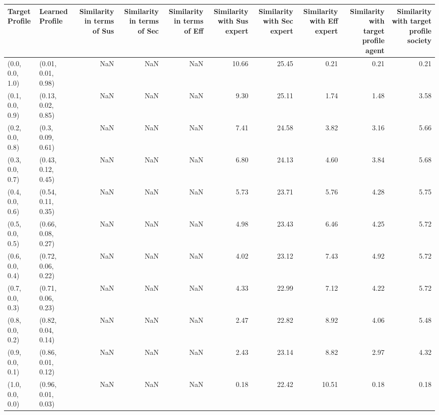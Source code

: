 \begin{tabular}{llrrrrrrrr}
\toprule
Target Profile & Learned Profile & Similarity in terms of Sus & Similarity in terms of Sec & Similarity in terms of Eff & Similarity with Sus expert & Similarity with Sec expert & Similarity with Eff expert & Similarity with target profile agent & Similarity with target profile society \\
\midrule
(0.0, 0.0, 1.0) & (0.01, 0.01, 0.98) & NaN & NaN & NaN & 10.66 & 25.45 & 0.21 & 0.21 & 0.21 \\
(0.1, 0.0, 0.9) & (0.13, 0.02, 0.85) & NaN & NaN & NaN & 9.30 & 25.11 & 1.74 & 1.48 & 3.58 \\
(0.2, 0.0, 0.8) & (0.3, 0.09, 0.61) & NaN & NaN & NaN & 7.41 & 24.58 & 3.82 & 3.16 & 5.66 \\
(0.3, 0.0, 0.7) & (0.43, 0.12, 0.45) & NaN & NaN & NaN & 6.80 & 24.13 & 4.60 & 3.84 & 5.68 \\
(0.4, 0.0, 0.6) & (0.54, 0.11, 0.35) & NaN & NaN & NaN & 5.73 & 23.71 & 5.76 & 4.28 & 5.75 \\
(0.5, 0.0, 0.5) & (0.66, 0.08, 0.27) & NaN & NaN & NaN & 4.98 & 23.43 & 6.46 & 4.25 & 5.72 \\
(0.6, 0.0, 0.4) & (0.72, 0.06, 0.22) & NaN & NaN & NaN & 4.02 & 23.12 & 7.43 & 4.92 & 5.72 \\
(0.7, 0.0, 0.3) & (0.71, 0.06, 0.23) & NaN & NaN & NaN & 4.33 & 22.99 & 7.12 & 4.22 & 5.72 \\
(0.8, 0.0, 0.2) & (0.82, 0.04, 0.14) & NaN & NaN & NaN & 2.47 & 22.82 & 8.92 & 4.06 & 5.48 \\
(0.9, 0.0, 0.1) & (0.86, 0.01, 0.12) & NaN & NaN & NaN & 2.43 & 23.14 & 8.82 & 2.97 & 4.32 \\
(1.0, 0.0, 0.0) & (0.96, 0.01, 0.03) & NaN & NaN & NaN & 0.18 & 22.42 & 10.51 & 0.18 & 0.18 \\
\bottomrule
\end{tabular}
